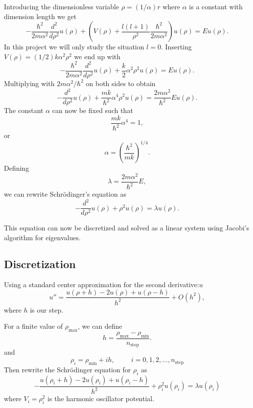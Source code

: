 \documentclass[11pt,a4paper,english]{article}
\numberwithin{equation}{section}
\begin{document}
Introducing the dimensionless variable $\rho = (1/\alpha) r$
where $\alpha$ is a constant with dimension length we get
% 
\[
  -\frac{\hbar^2}{2 m \alpha^2} \frac{d^2}{d\rho^2} u(\rho) 
       + \left ( V(\rho) + \frac{l (l + 1)}{\rho^2}
         \frac{\hbar^2}{2 m\alpha^2} \right ) u(\rho)  = E u(\rho) .
\]
%
In this project we will only study the situation $l=0$.
Inserting $V(\rho) = (1/2) k \alpha^2\rho^2$ we end up with
\[
  -\frac{\hbar^2}{2 m \alpha^2} \frac{d^2}{d\rho^2} u(\rho) 
       + \frac{k}{2} \alpha^2\rho^2u(\rho)  = E u(\rho) .
\]
Multiplying with $2m\alpha^2/\hbar^2$ on both sides to obtain
\[
  -\frac{d^2}{d\rho^2} u(\rho) 
       + \frac{mk}{\hbar^2} \alpha^4\rho^2u(\rho)  = \frac{2m\alpha^2}{\hbar^2}E u(\rho) .
\]
The constant $\alpha$ can now be fixed such that
\[
\frac{mk}{\hbar^2} \alpha^4 = 1,
\]
or 
\[
\alpha = \left(\frac{\hbar^2}{mk}\right)^{1/4}.
\]
Defining 
\[
\lambda = \frac{2m\alpha^2}{\hbar^2}E,
\]
we can rewrite Schr\"odinger's equation as
\begin{equation}
  -\frac{d^2}{d\rho^2} u(\rho) + \rho^2u(\rho)  = \lambda u(\rho) .
\end{equation}

This equation can now be discretized and solved as a linear system using Jacobi's algorithm for eigenvalues. 
 
\subsection{Discretization}

Using a standard center approximation for the second derivative:$u$
\begin{equation}
    u''=\frac{u(\rho+h) -2u(\rho) +u(\rho-h)}{h^2} +O(h^2),
    \label{eq:diffoperation}
\end{equation} 
where $h$ is our step.

For a finite value of $\rho_{\mathrm{max}}$, we can define 
\[
  h=\frac{\rho_{\mathrm{max}}-\rho_{\mathrm{min}} }{n_{\mathrm{step}}}.
\]
and 
\[
    \rho_i= \rho_{\mathrm{min}} + ih, \hspace{1cm} i=0,1,2,\dots , n_{\mathrm{step}}
\]
Then rewrite the Schr\"odinger equation for $\rho_i$ as
\[
-\frac{u(\rho_i+h) -2u(\rho_i) +u(\rho_i-h)}{h^2}+\rho_i^2u(\rho_i)  = \lambda u(\rho_i)
\]
where $V_i=\rho_i^2$ is the harmonic oscillator potential.
\end{document}
